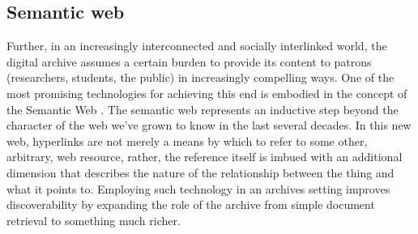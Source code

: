 \subsection{Semantic web}
Further, in an increasingly interconnected and socially interlinked world, the digital archive assumes a certain burden to provide its content to patrons (researchers, students, the public) in increasingly compelling ways. One of the most promising technologies for achieving this end is embodied in the concept of the Semantic Web \needcite[TBL]. The semantic web represents an inductive step beyond the character of the web we've grown to know in the last several decades. In this new web, hyperlinks are not merely a means by which to refer to some other, arbitrary, web resource, rather, the reference itself is imbued with an additional dimension that describes the nature of the relationship between the thing and what it points to. \needcite[Barthes?] Employing such technology in an archives setting improves discoverability by expanding the role of the archive from simple document retrieval to something much richer.